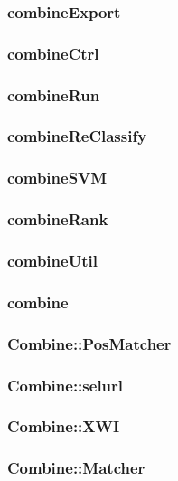 \subsubsection{combineExport}

\htmlrule\hrulefill
\subsubsection{combineCtrl}

\htmlrule\hrulefill
\subsubsection{combineRun}

\htmlrule\hrulefill
\subsubsection{combineReClassify}

\htmlrule\hrulefill
\subsubsection{combineSVM}

\htmlrule\hrulefill
\subsubsection{combineRank}

\htmlrule\hrulefill
\subsubsection{combineUtil}

\htmlrule\hrulefill
\subsubsection{combine}

\htmlrule\hrulefill
\subsubsection{Combine::PosMatcher}

\htmlrule\hrulefill
\subsubsection{Combine::selurl}

\htmlrule\hrulefill
\subsubsection{Combine::XWI}

\htmlrule\hrulefill
\subsubsection{Combine::Matcher}

\htmlrule\hrulefill
